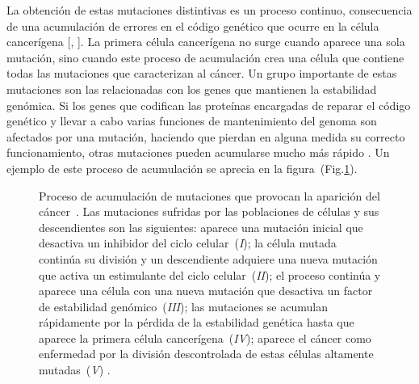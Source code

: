 \hspace{.1cm}La obtención de estas mutaciones distintivas es un proceso continuo, consecuencia de una acumulación de errores en el código genético que ocurre en la célula cancerígena [\cite{invasion}, \cite{cancerbook}]. La primera célula cancerígena no surge cuando aparece una sola mutación, sino cuando este proceso de acumulación crea una célula que contiene todas las mutaciones que caracterizan al cáncer. Un grupo importante de estas mutaciones son las relacionadas con los genes que mantienen la estabilidad genómica. Si los genes que codifican las proteínas encargadas de reparar el código genético y llevar a cabo varias funciones de mantenimiento del genoma son afectados por una mutación, haciendo que pierdan en alguna medida su correcto funcionamiento, otras mutaciones pueden acumularse mucho más rápido \cite{robins}. Un ejemplo de este proceso de acumulación se aprecia en la figura~(Fig.\ref{fig-evolution}).

\begin{figure}[!ht]
    \begin{center}
    \end{center}\vspace*{-0.6cm}
    \caption[Proceso de acumulaci\'on de mutaciones que provocan la aparici\'on del c\'ancer]{Proceso de acumulaci\'on de mutaciones que provocan la aparici\'on del c\'ancer~\cite{robins}. Las mutaciones sufridas por las poblaciones de c\'elulas y sus descendientes son las siguientes: aparece una mutaci\'on inicial que desactiva un inhibidor del ciclo celular~(\emph{I}); la c\'elula mutada contin\'ua su divisi\'on y un descendiente adquiere una nueva mutaci\'on que activa un estimulante del ciclo celular~(\emph{II}); el proceso contin\'ua y aparece una c\'elula con una nueva mutaci\'on que desactiva un factor de estabilidad gen\'omico~(\emph{III}); las mutaciones se acumulan r\'apidamente por la p\'erdida de la estabilidad gen\'etica hasta que aparece la primera c\'elula cancer\'igena~(\emph{IV}); aparece el c\'ancer como enfermedad por la divisi\'on descontrolada de estas c\'elulas altamente mutadas~(\emph{V}) \cite{viabarre2019}.}
    \label{fig-evolution}
    \end{figure}

